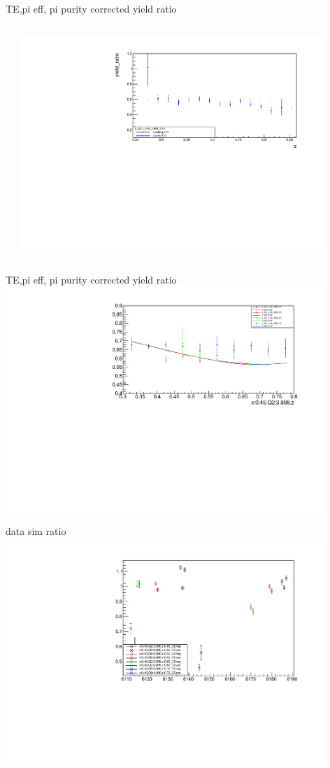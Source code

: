 \begin{frame}{TE,pi eff, pi purity corrected yield ratio}
\begin{columns}
\begin{column}[T]{0.5\textwidth}
\end{column}
\begin{column}[T]{0.5\textwidth}
\includegraphics[width = 0.9\textwidth]{results/yield/statistics_corr/x_Q2_z_45_3898_70_ratio.pdf}
\end{column}
\end{columns}
\end{frame}
\begin{frame}{TE,pi eff, pi purity corrected yield ratio}
\includegraphics[width = 0.9\textwidth]{results/yield/statistics_corr/x_Q2_45_3898_ratio.pdf}
\end{frame}
\begin{frame}{data sim ratio}
    \includegraphics[width = 0.9\textwidth]{results/yield/run_info_pdf/x_Q2_45_3898_data_simc_ratio.pdf}
\end{frame}
